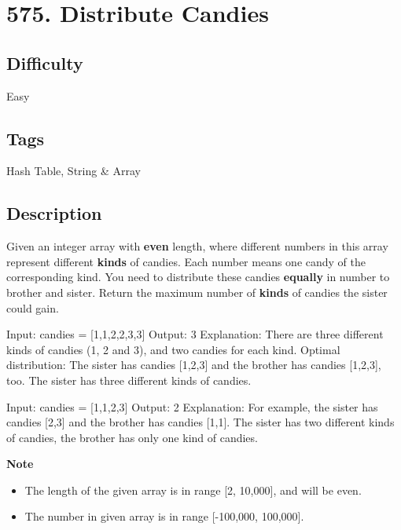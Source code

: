 \tocless\section{575. Distribute Candies}
\label{algo:575}

\subsection*{Difficulty}
Easy

\subsection*{Tags}
Hash Table, String \& Array

\subsection*{Description}
Given an integer array with \textbf{even} length, where different numbers in this array represent different \textbf{kinds} of candies. Each number means one candy of the corresponding kind. You need to distribute these candies \textbf{equally} in number to brother and sister. Return the maximum number of \textbf{kinds} of candies the sister could gain.

\begin{example}
\begin{multilinecode}
Input: candies = [1,1,2,2,3,3]
Output: 3
Explanation:
There are three different kinds of candies (1, 2 and 3), and two candies for each kind.
Optimal distribution: The sister has candies [1,2,3] and the brother has candies [1,2,3], too.
The sister has three different kinds of candies.
\end{multilinecode}
\end{example}

\begin{example}
\begin{multilinecode}
Input: candies = [1,1,2,3]
Output: 2
Explanation:
For example, the sister has candies [2,3] and the brother has candies [1,1].
The sister has two different kinds of candies, the brother has only one kind of candies.
\end{multilinecode}
\end{example}

\textbf{Note}
\begin{itemize}
    \item The length of the given array is in range [2, 10,000], and will be even.
    \item The number in given array is in range [-100,000, 100,000].
\end{itemize}

